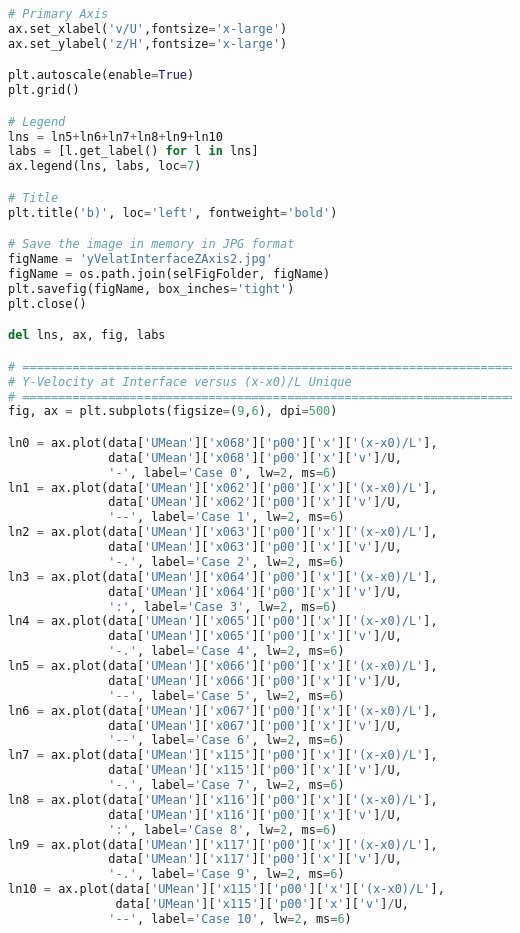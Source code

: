 \begin{lstlisting}[language=python]
# Primary Axis
ax.set_xlabel('v/U',fontsize='x-large')
ax.set_ylabel('z/H',fontsize='x-large')

plt.autoscale(enable=True)
plt.grid()

# Legend
lns = ln5+ln6+ln7+ln8+ln9+ln10
labs = [l.get_label() for l in lns]
ax.legend(lns, labs, loc=7)

# Title
plt.title('b)', loc='left', fontweight='bold')

# Save the image in memory in JPG format
figName = 'yVelatInterfaceZAxis2.jpg'
figName = os.path.join(selFigFolder, figName)
plt.savefig(figName, box_inches='tight')
plt.close()

del lns, ax, fig, labs

# =============================================================================
# Y-Velocity at Interface versus (x-x0)/L Unique
# =============================================================================
fig, ax = plt.subplots(figsize=(9,6), dpi=500)

ln0 = ax.plot(data['UMean']['x068']['p00']['x']['(x-x0)/L'],
              data['UMean']['x068']['p00']['x']['v']/U,
              '-', label='Case 0', lw=2, ms=6)
ln1 = ax.plot(data['UMean']['x062']['p00']['x']['(x-x0)/L'],
              data['UMean']['x062']['p00']['x']['v']/U,
              '--', label='Case 1', lw=2, ms=6)
ln2 = ax.plot(data['UMean']['x063']['p00']['x']['(x-x0)/L'],
              data['UMean']['x063']['p00']['x']['v']/U,
              '-.', label='Case 2', lw=2, ms=6)
ln3 = ax.plot(data['UMean']['x064']['p00']['x']['(x-x0)/L'],
              data['UMean']['x064']['p00']['x']['v']/U,
              ':', label='Case 3', lw=2, ms=6)
ln4 = ax.plot(data['UMean']['x065']['p00']['x']['(x-x0)/L'],
              data['UMean']['x065']['p00']['x']['v']/U,
              '-.', label='Case 4', lw=2, ms=6)
ln5 = ax.plot(data['UMean']['x066']['p00']['x']['(x-x0)/L'],
              data['UMean']['x066']['p00']['x']['v']/U,
              '--', label='Case 5', lw=2, ms=6)
ln6 = ax.plot(data['UMean']['x067']['p00']['x']['(x-x0)/L'],
              data['UMean']['x067']['p00']['x']['v']/U,
              '--', label='Case 6', lw=2, ms=6)
ln7 = ax.plot(data['UMean']['x115']['p00']['x']['(x-x0)/L'],
              data['UMean']['x115']['p00']['x']['v']/U,
              '-.', label='Case 7', lw=2, ms=6)
ln8 = ax.plot(data['UMean']['x116']['p00']['x']['(x-x0)/L'],
              data['UMean']['x116']['p00']['x']['v']/U,
              ':', label='Case 8', lw=2, ms=6)
ln9 = ax.plot(data['UMean']['x117']['p00']['x']['(x-x0)/L'],
              data['UMean']['x117']['p00']['x']['v']/U,
              '-.', label='Case 9', lw=2, ms=6)
ln10 = ax.plot(data['UMean']['x115']['p00']['x']['(x-x0)/L'],
               data['UMean']['x115']['p00']['x']['v']/U,
              '--', label='Case 10', lw=2, ms=6)


\end{lstlisting}
